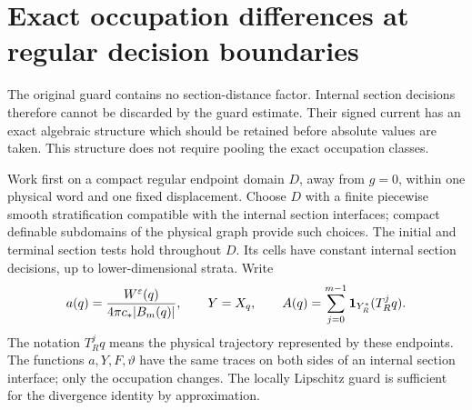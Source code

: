 \section{Exact occupation differences at regular decision boundaries}
\label{sec:v78-seams}
The original guard contains no section-distance factor. Internal
section decisions therefore cannot be discarded by the guard estimate.
Their signed current has an exact algebraic structure which should
be retained before absolute values are taken. This structure does
not require pooling the exact occupation classes.

Work first on a compact regular endpoint domain $D$, away from
$g=0$, within one physical word and one fixed displacement. Choose
$D$ with a finite piecewise smooth stratification compatible with
the internal section interfaces; compact definable subdomains of
the physical graph provide such choices. The initial and terminal
section tests hold throughout $D$. Its cells have constant internal
section decisions, up to lower-dimensional strata. Write
\[
 a(q)=\frac{W^\varepsilon(q)}{4\pi c_*|B_m(q)|},\qquad
 Y=X_q,\qquad A(q)=\sum_{j=0}^{m-1}\mathbf1_{Y_R^*}(T_R^jq).
\]
The notation $T_R^jq$ means the physical trajectory represented by
these endpoints. The functions $a,Y,F,\vartheta$ have the same
traces on both sides of an internal section interface; only the
occupation changes. The locally Lipschitz guard is sufficient for
the divergence identity by approximation.

